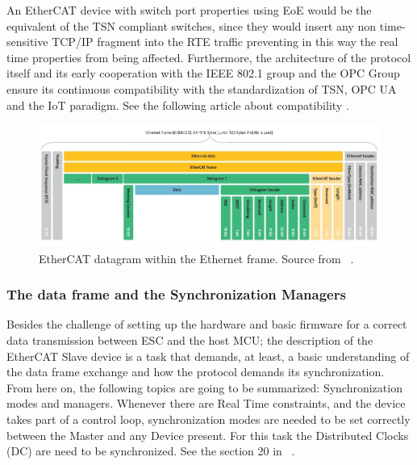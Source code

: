 An EtherCAT device with switch port properties using EoE would be the equivalent of the TSN compliant
switches, since they would insert any non time-sensitive TCP/IP fragment into the RTE traffic preventing
in this way the real time properties from being affected. Furthermore, the architecture of the protocol itself and
its early cooperation with the IEEE 802.1 group and the OPC Group ensure its continuous compatibility with the
standardization of TSN, OPC UA and the IoT paradigm. See the following article about compatibility \cite{beckhoff_compatibility}.%




\begin{figure}[ht]
    \centering
    \includegraphics[width=\textwidth]{imgs/impl-dataframe.jpg}
    \caption{EtherCAT datagram within the Ethernet frame. Source from ~\cite{beckhoff_datalink}.}
    \label{fig:dataframe}
\end{figure}

\subsubsection{The data frame and the Synchronization Managers}\label{sec:synch_managers}

Besides the challenge of setting up the hardware and basic firmware for a correct data transmission between ESC and the host MCU; the description of the EtherCAT 
Slave device is a task that demands, at least, a basic understanding of the data frame exchange and how the protocol demands its synchronization. From here on, the following
topics are going to be summarized: Synchronization modes and managers.
Whenever there are Real Time constraints, and the device takes part of a control loop, synchronization modes are needed to be set correctly between the Master and
any Device present. For this task the Distributed Clocks (DC) are need to be synchronized. See the section 20 in ~\cite{beckhoff_enhancements}. %

